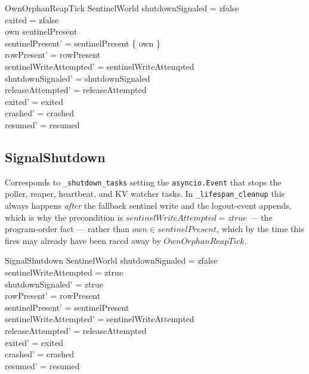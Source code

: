 \documentclass[a4paper,10pt,fleqn]{article}
\begin{document}
\begin{schema}{OwnOrphanReapTick}
  \Delta SentinelWorld
  \where
  shutdownSignaled = zfalse \\
  exited = zfalse \\
  own \in sentinelPresent \\
  sentinelPresent' = sentinelPresent \setminus \{ own \} \\
  rowPresent' = rowPresent \\
  sentinelWriteAttempted' = sentinelWriteAttempted \\
  shutdownSignaled' = shutdownSignaled \\
  releaseAttempted' = releaseAttempted \\
  exited' = exited \\
  crashed' = crashed \\
  resumed' = resumed
\end{schema}

\subsection{SignalShutdown}

Corresponds to \texttt{\_shutdown\_tasks} setting the
\texttt{asyncio.Event} that stops the poller, reaper, heartbeat, and KV
watcher tasks.  In \texttt{\_lifespan\_cleanup} this always happens
\emph{after} the fallback sentinel write and the logout-event appends,
which is why the precondition is $sentinelWriteAttempted = ztrue$ ---
the program-order fact --- rather than $own \in sentinelPresent$, which
by the time this fires may already have been raced away by
$OwnOrphanReapTick$.

\begin{schema}{SignalShutdown}
  \Delta SentinelWorld
  \where
  shutdownSignaled = zfalse \\
  sentinelWriteAttempted = ztrue \\
  shutdownSignaled' = ztrue \\
  rowPresent' = rowPresent \\
  sentinelPresent' = sentinelPresent \\
  sentinelWriteAttempted' = sentinelWriteAttempted \\
  releaseAttempted' = releaseAttempted \\
  exited' = exited \\
  crashed' = crashed \\
  resumed' = resumed
\end{schema}
\end{document}
